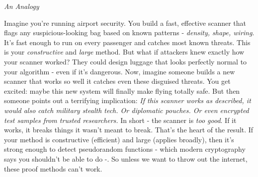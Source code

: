 \documentclass[12pt]{report}
\begin{document}
\begin{center}
    \vspace{0cm}
    {\large\itshape An Analogy\par}
\end{center}
Imagine you're running airport security.  
You build a fast, effective scanner that flags any suspicious-looking bag based on known patterns - \textit{density, shape, wiring}.
It's fast enough to run on every passenger and catches most known threats.
This is your \textit{constructive} and \textit{large} method.
But what if attackers knew exactly how your scanner worked?  
They could design luggage that looks perfectly normal to your algorithm - even if it's dangerous.
Now, imagine someone builds a new scanner that works so well it catches even these disguised threats.
You get excited: maybe this new system will finally make flying totally safe.
But then someone points out a terrifying implication:  
\textit{If this scanner works as described, it would also catch military stealth tech. Or diplomatic pouches. Or even encrypted test samples from trusted researchers.}
In short - the scanner is \textit{too good}.  
If it works, it breaks things it wasn't meant to break.
That's the heart of the \cite{razborov1994} result.
If your method is constructive (efficient) and large (applies broadly), then it's strong enough to detect pseudorandom functions - which modern cryptography says you shouldn't be able to do -\cite{arora2009}.  
So unless we want to throw out the internet, these proof methods can't work.



\end{document}
